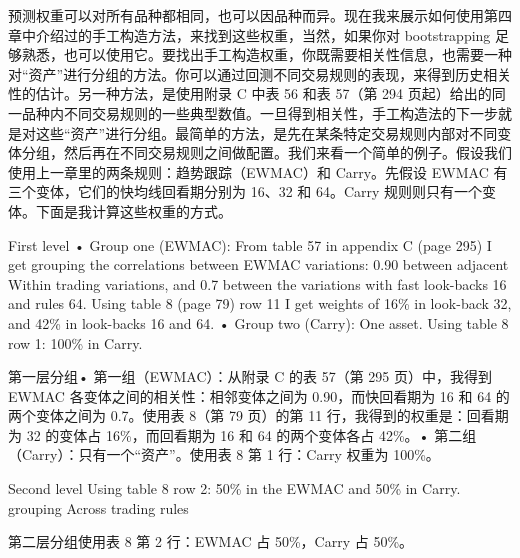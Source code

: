 \begin{chineseblock}预测权重可以对所有品种都相同，也可以因品种而异。现在我来展示如何使用第四章中介绍过的手工构造方法，来找到这些权重，当然，如果你对 bootstrapping 足够熟悉，也可以使用它。要找出手工构造权重，你既需要相关性信息，也需要一种对“资产”进行分组的方法。你可以通过回测不同交易规则的表现，来得到历史相关性的估计。另一种方法，是使用附录 C 中表 56 和表 57（第 294 页起）给出的同一品种内不同交易规则的一些典型数值。一旦得到相关性，手工构造法的下一步就是对这些“资产”进行分组。最简单的方法，是先在某条特定交易规则内部对不同变体分组，然后再在不同交易规则之间做配置。我们来看一个简单的例子。假设我们使用上一章里的两条规则：趋势跟踪（EWMAC）和 Carry。先假设 EWMAC 有三个变体，它们的快均线回看期分别为 16、32 和 64。Carry 规则则只有一个变体。下面是我计算这些权重的方式。\end{chineseblock}

\bipairgap

\begin{englishblock} First level • Group one (EWMAC): From table 57 in appendix C (page 295) I get grouping the correlations between EWMAC variations: 0.90 between adjacent Within trading variations, and 0.7 between the variations with fast look-backs 16 and rules 64. Using table 8 (page 79) row 11 I get weights of 16\% in look-back 32, and 42\% in look-backs 16 and 64. • Group two (Carry): One asset. Using table 8 row 1: 100\% in Carry. \end{englishblock}

\begin{chineseblock}第一层分组• 第一组（EWMAC）：从附录 C 的表 57（第 295 页）中，我得到 EWMAC 各变体之间的相关性：相邻变体之间为 0.90，而快回看期为 16 和 64 的两个变体之间为 0.7。使用表 8（第 79 页）的第 11 行，我得到的权重是：回看期为 32 的变体占 16\%，而回看期为 16 和 64 的两个变体各占 42\%。• 第二组（Carry）：只有一个“资产”。使用表 8 第 1 行：Carry 权重为 100\%。 \end{chineseblock}

\bipairgap

\begin{englishblock} Second level Using table 8 row 2: 50\% in the EWMAC and 50\% in Carry. grouping Across trading rules \end{englishblock}

\begin{chineseblock}第二层分组使用表 8 第 2 行：EWMAC 占 50\%，Carry 占 50\%。 \end{chineseblock}

\bipairgap

